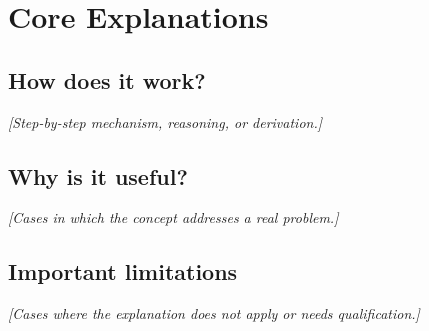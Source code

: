 \section{Core Explanations}
\label{sec:mechanisms}

\subsection{How does it work?}
\emph{[Step-by-step mechanism, reasoning, or derivation.]}

\subsection{Why is it useful?}
\emph{[Cases in which the concept addresses a real problem.]}

\subsection{Important limitations}
\emph{[Cases where the explanation does not apply or needs qualification.]}
